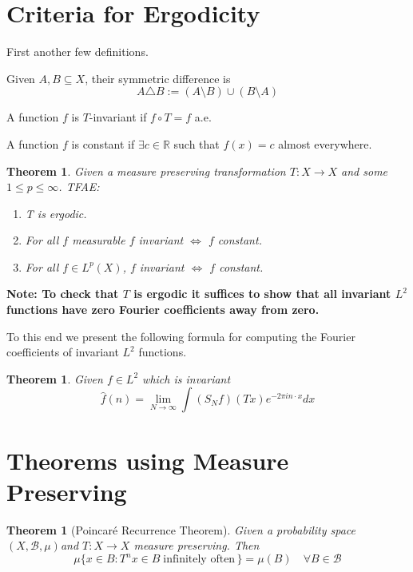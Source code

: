 \documentclass[11pt]{article}
\newcommand{\defeq}{:=}
\newcommand{\msrspc}{\ensuremath{(X,\mathcal{B},\mu)}}
\newcommand{\symd}{\triangle}
\newcommand{\R}{\mathbb{R}}
\newenvironment{defin}
	{\begin{mdframed}[backgroundcolor=white, roundcorner=5pt, linewidth=1pt]}
	{\end{mdframed}}
\newcommand{\mdf}[1]{{\color{red} #1}}
\newenvironment{note}
	{\begin{mdframed}[backgroundcolor=white, linecolor=red, roundcorner=5pt, linewidth=1pt]\bfseries{Note:}\normalfont}
	{\end{mdframed}}
\newtheorem{theorem}[prop]{Theorem}
\begin{document}
\section{Criteria for Ergodicity}
First another few definitions.
\begin{defin}
Given $A,B\subseteq X$, their \mdf{symmetric difference} is
$$A\symd B\defeq (A \setminus B)\cup (B \setminus A)$$

A function $f$ is \mdf{$T$-invariant} if $f \circ T = f$ a.e.

A function $f$ is \mdf{constant} if $\exists c\in\R$ such that $f(x) = c$ almost everywhere.
\end{defin}

\begin{theorem}
Given a measure preserving transformation $T:X\to X$ and some $1\leq p\leq\infty$. TFAE:
\begin{enumerate}
	\item T is ergodic.
	\item For all $f$ measurable $f$ invariant $\iff$ $f$ constant.
	\item For all $f\in L^p(X)$, $f$ invariant $\iff$ $f$ constant.
\end{enumerate}
\end{theorem}
\begin{note}
To check that $T$ is ergodic it suffices to show that all invariant $L^2$ functions have zero Fourier coefficients away from zero.
\end{note}
To this end we present the following formula for computing the Fourier coefficients of invariant $L^2$ functions.
\begin{theorem}
Given $f\in L^2$ which is invariant
$$\hat{f}(n)=\lim_{N\to\infty}\int (S_Nf)(Tx)e^{-2\pi i n\cdot x}dx$$
\end{theorem}

\section{Theorems using Measure Preserving}
\begin{theorem}[Poincar\'e Recurrence Theorem]
	Given a probability space \msrspc and $T:X\to X$ measure preserving. Then
	$$\mu\{x\in B : T^nx\in B \; \text{infinitely often}\,\}=\mu(B)\quad \forall B\in\mathcal{B}$$
\end{theorem}
\end{document}
